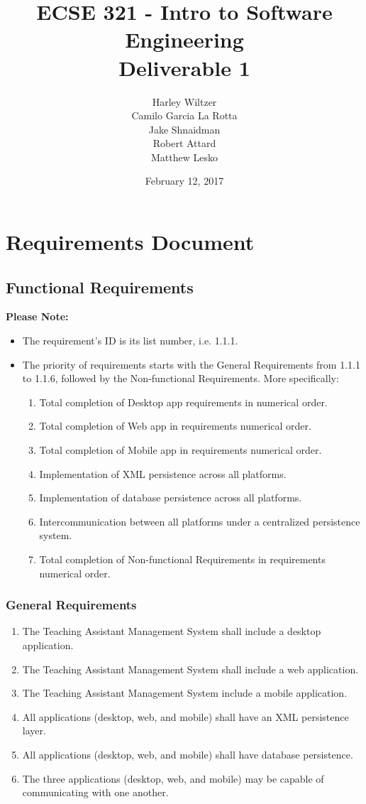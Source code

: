 \documentclass[12pt,openany]{report}
\title{ECSE 321 - Intro to Software Engineering\\Deliverable 1}
\author{Harley Wiltzer\\Camilo Garcia La Rotta\\Jake Shnaidman\\Robert Attard\\Matthew Lesko}
\date{February 12, 2017}
\begin{document}
\maketitle
\newpage
{} %
\tableofcontents
\chapter{Requirements Document}
\section{Functional Requirements}
\textbf{Please Note:}
\begin{itemize}
    \item The requirement's ID is its list number, i.e. 1.1.1.
    \item The priority of requirements starts with the General Requirements from 1.1.1 to 1.1.6, followed by the Non-functional Requirements. 
    More specifically:
        \begin{enumerate}
            \item Total completion of Desktop app requirements in numerical order.
            \item Total completion of Web app in requirements numerical order.
            \item Total completion of Mobile app in requirements numerical order.
            \item Implementation of XML persistence across all platforms.
            \item Implementation of database persistence across all platforms.
            \item Intercommunication between all platforms under a centralized persistence system.
            \item Total completion of Non-functional Requirements in requirements numerical order.
        \end{enumerate} 
\end{itemize}
\subsection{General Requirements}
\begin{enumerate}[\thesubsection .1]
	\item The Teaching Assistant Management System shall include a desktop application.
	\item The Teaching Assistant Management System shall include a web application.
	\item The Teaching Assistant Management System include a mobile application.
	\item All applications (desktop, web, and mobile) shall have an XML persistence layer.
	\item All applications (desktop, web, and mobile) shall have database persistence.
	\item The three applications (desktop, web, and mobile) may be capable of communicating with
		one another.
\end{enumerate}
\end{document}

